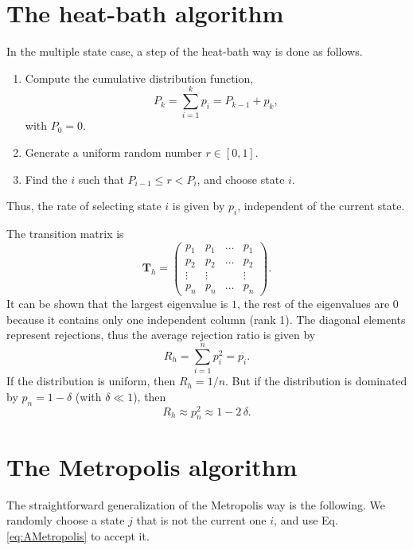 \documentclass[12pt]{article}
\begin{document}
\section{\label{sec:heatbath}
The heat-bath algorithm}

In the multiple state case,
a step of the heat-bath way is done as follows.
%
\begin{enumerate}
  \item Compute the cumulative distribution function,
    $$
    P_k = \sum_{i=1}^k p_i = P_{k-1} + p_k,
    $$
    with $P_0 = 0$.
  \item Generate a uniform random number $r \in [0, 1]$.
  \item Find the $i$ such that $P_{i-1} \le r < P_i$,
    and choose state $i$.
\end{enumerate}
Thus, the rate of selecting state $i$
is given by $p_i$, independent of the current state.

The transition matrix is
$$
\mathbf T_h =
\left(
  \begin{array}{cccccc}
    p_1 & p_1 & \dots & p_1 \\
    p_2 & p_2 & \dots & p_2 \\
    \vdots & \vdots  &  & \vdots \\
    p_n & p_n & \dots & p_n
  \end{array}
\right).
$$
It can be shown that
the largest eigenvalue is $1$, the rest of the eigenvalues are $0$
because it contains only one independent column (rank 1).
%
The diagonal elements represent rejections,
thus the average rejection ratio is given by
\begin{equation}
  R_h = \sum_{i = 1}^n p_i^2 = \overline { p_i }.
\label{eq:rejection_heatbath}
\end{equation}
If the distribution is uniform, then $R_h = 1/n$.
But if the distribution is dominated by $p_n = 1 - \delta$
(with $\delta \ll 1$),
then
\begin{equation}
  R_h \approx p_n^2 \approx 1 - 2 \, \delta.
\label{eq:rejection_heatbath_domlimit}
\end{equation}




\section{\label{sec:Metropolis}
The Metropolis algorithm}


The straightforward generalization of the Metropolis way is the following.
We randomly choose a state $j$ that is not the current one $i$,
and use Eq. \eqref{eq:AMetropolis} to accept it.
\end{document}
